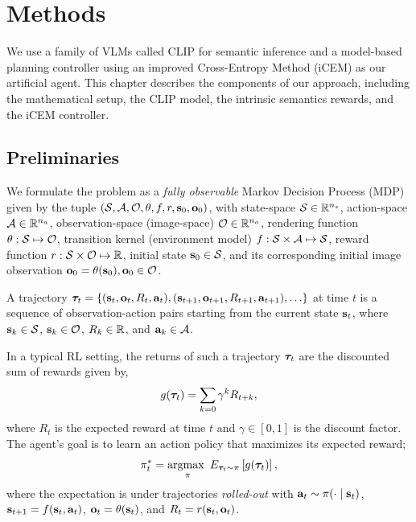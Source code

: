 \chapter{Methods}
\label{sec:methods}

We use a family of VLMs called CLIP \citep{clip} for semantic inference and a model-based planning controller using an improved Cross-Entropy Method (iCEM) \citep{icem} as our artificial agent.
This chapter describes the components of our approach, including the mathematical setup, the CLIP model, the intrinsic semantics rewards, and the iCEM controller.

\section{Preliminaries}
\label{sec:preliminaries}
We formulate the problem as a \emph{fully observable} Markov Decision Process (MDP) given by the tuple \((\mathcal{S}, \mathcal{A}, \mathcal{O}, \theta, f, r, \mathbf{s}_0, \mathbf{o}_0)\), with state-space \(\mathcal{S} \in \mathbb{R}^{n_s}\), action-space \(\mathcal{A} \in \mathbb{R}^{n_a}\), observation-space (image-space) \(\mathcal{O} \in \mathbb{R}^{n_o}\), rendering function \(\theta: \mathcal{S} \mapsto \mathcal{O}\), transition kernel (environment model) \(f: \mathcal{S} \times \mathcal{A} \mapsto \mathcal{S}\), reward function \(r: \mathcal{S} \times \mathcal{O} \mapsto \mathbb{R}\), initial state \(\mathbf{s}_0 \in \mathcal{S}\), and its corresponding initial image observation \(\mathbf{o}_0 = \theta(\mathbf{s}_0), \mathbf{o}_0 \in \mathcal{O}\).

A trajectory \(\bm{\tau}_t = \{(\mathbf{s}_t, \mathbf{o}_t, R_t, \mathbf{a}_t), (\mathbf{s}_{t+1}, \mathbf{o}_{t+1}, R_{t+1}, \mathbf{a}_{t+1}), \ldots \}\) at time \(t\) is a sequence of observation-action pairs starting from the current state \(\mathbf{s}_t\), where \(\mathbf{s}_k \in \mathcal{S}\), \(\mathbf{s}_k \in \mathcal{O}\), \(R_k \in \mathbb{R}\), and \(\mathbf{a}_k \in \mathcal{A}\).

In a typical RL setting, the returns of such a trajectory \(\bm{\tau}_t\) are the discounted sum of rewards given by,
\begin{equation}
    \label{eq:rl-goal}
    g(\bm{\tau}_t) = \sum_{k=0} \gamma^k R_{t+k},
\end{equation}
where \(R_t\) is the expected reward at time \(t\) and \(\gamma \in [0, 1]\) is the discount factor. The agent's goal is to learn an action policy that maximizes its expected reward;
\begin{equation}
    \label{eq:rl-policy}
    \pi^*_t = \operatorname*{argmax~}_{\pi} E_{\bm{\tau}_t \sim \pi} \left[ g(\bm{\tau}_t) \right],
\end{equation}
where the expectation is under trajectories \emph{rolled-out} with \(\mathbf{a}_t \sim \pi(\cdot \mid \mathbf{s}_t)\), \(\mathbf{s}_{t+1} = f(\mathbf{s}_t, \mathbf{a}_t)\), \(\mathbf{o}_t = \theta(\mathbf{s}_t)\), and \(R_t = r(\mathbf{s}_t, \mathbf{o}_t)\).

